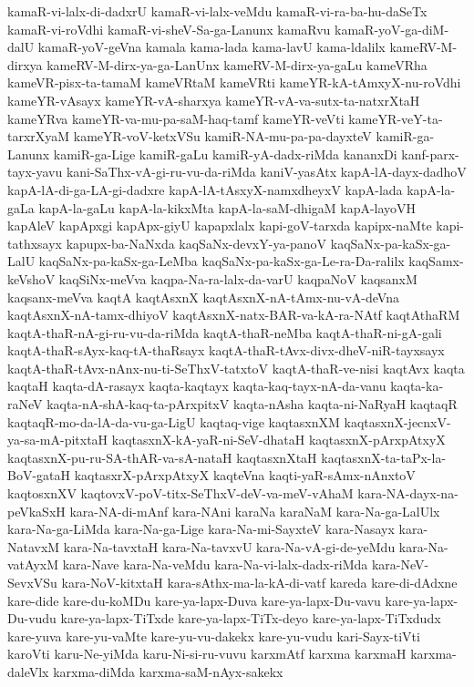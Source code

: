 {kamaR-vi-lalx-di-dadxrU
kamaR-vi-lalx-veMdu
kamaR-vi-ra-ba-hu-daSeTx
kamaR-vi-roVdhi
kamaR-vi-sheV-Sa-ga-Lanunx
kamaRvu
kamaR-yoV-ga-diM-dalU
kamaR-yoV-geVna
kamala
kama-lada
kama-lavU
kama-ldalilx
kameRV-M-dirxya
kameRV-M-dirx-ya-ga-LanUnx
kameRV-M-dirx-ya-gaLu
kameVRha
kameVR-pisx-ta-tamaM
kameVRtaM
kameVRti
kameYR-kA-tAmxyX-nu-roVdhi
kameYR-vAsayx
kameYR-vA-sharxya
kameYR-vA-va-sutx-ta-natxrXtaH
kameYRva
kameYR-va-mu-pa-saM-haq-tamf
kameYR-veVti
kameYR-veY-ta-tarxrXyaM
kameYR-voV-ketxVSu
kamiR-NA-mu-pa-pa-dayxteV
kamiR-ga-Lanunx
kamiR-ga-Lige
kamiR-gaLu
kamiR-yA-dadx-riMda
kananxDi
kanf-parx-tayx-yavu
kani-SaThx-vA-gi-ru-vu-da-riMda
kaniV-yasAtx
kapA-lA-dayx-dadhoV
kapA-lA-di-ga-LA-gi-dadxre
kapA-lA-tAsxyX-namxdheyxV
kapA-lada
kapA-la-gaLa
kapA-la-gaLu
kapA-la-kikxMta
kapA-la-saM-dhigaM
kapA-layoVH
kapAleV
kapApxgi
kapApx-giyU
kapapxlalx
kapi-goV-tarxda
kapipx-naMte
kapi-tathxsayx
kapupx-ba-NaNxda
kaqSaNx-devxY-ya-panoV
kaqSaNx-pa-kaSx-ga-LalU
kaqSaNx-pa-kaSx-ga-LeMba
kaqSaNx-pa-kaSx-ga-Le-ra-Da-ralilx
kaqSamx-keVshoV
kaqSiNx-meVva
kaqpa-Na-ra-lalx-da-varU
kaqpaNoV
kaqsanxM
kaqsanx-meVva
kaqtA
kaqtAsxnX
kaqtAsxnX-nA-tAmx-nu-vA-deVna
kaqtAsxnX-nA-tamx-dhiyoV
kaqtAsxnX-natx-BAR-va-kA-ra-NAtf
kaqtAthaRM
kaqtA-thaR-nA-gi-ru-vu-da-riMda
kaqtA-thaR-neMba
kaqtA-thaR-ni-gA-gali
kaqtA-thaR-sAyx-kaq-tA-thaRsayx
kaqtA-thaR-tAvx-divx-dheV-niR-tayxsayx
kaqtA-thaR-tAvx-nAnx-nu-ti-SeThxV-tatxtoV
kaqtA-thaR-ve-nisi
kaqtAvx
kaqta
kaqtaH
kaqta-dA-rasayx
kaqta-kaqtayx
kaqta-kaq-tayx-nA-da-vanu
kaqta-ka-raNeV
kaqta-nA-shA-kaq-ta-pArxpitxV
kaqta-nAsha
kaqta-ni-NaRyaH
kaqtaqR
kaqtaqR-mo-da-lA-da-vu-ga-LigU
kaqtaq-vige
kaqtasxnXM
kaqtasxnX-jecnxV-ya-sa-mA-pitxtaH
kaqtasxnX-kA-yaR-ni-SeV-dhataH
kaqtasxnX-pArxpAtxyX
kaqtasxnX-pu-ru-SA-thAR-va-sA-nataH
kaqtasxnXtaH
kaqtasxnX-ta-taPx-la-BoV-gataH
kaqtasxrX-pArxpAtxyX
kaqteVna
kaqti-yaR-sAmx-nAnxtoV
kaqtosxnXV
kaqtovxV-poV-titx-SeThxV-deV-va-meV-vAhaM
kara-NA-dayx-na-peVkaSxH
kara-NA-di-mAnf
kara-NAni
karaNa
karaNaM
kara-Na-ga-LalUlx
kara-Na-ga-LiMda
kara-Na-ga-Lige
kara-Na-mi-SayxteV
kara-Nasayx
kara-NatavxM
kara-Na-tavxtaH
kara-Na-tavxvU
kara-Na-vA-gi-de-yeMdu
kara-Na-vatAyxM
kara-Nave
kara-Na-veMdu
kara-Na-vi-lalx-dadx-riMda
kara-NeV-SevxVSu
kara-NoV-kitxtaH
kara-sAthx-ma-la-kA-di-vatf
kareda
kare-di-dAdxne
kare-dide
kare-du-koMDu
kare-ya-lapx-Duva
kare-ya-lapx-Du-vavu
kare-ya-lapx-Du-vudu
kare-ya-lapx-TiTxde
kare-ya-lapx-TiTx-deyo
kare-ya-lapx-TiTxdudx
kare-yuva
kare-yu-vaMte
kare-yu-vu-dakekx
kare-yu-vudu
kari-Sayx-tiVti
karoVti
karu-Ne-yiMda
karu-Ni-si-ru-vuvu
karxmAtf
karxma
karxmaH
karxma-daleVlx
karxma-diMda
karxma-saM-nAyx-sakekx
}

